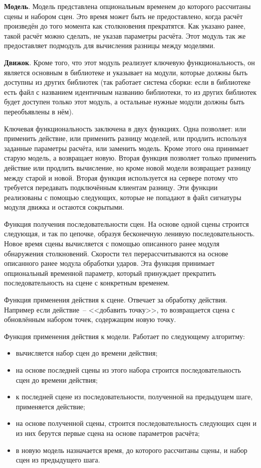 \textbf{Модель}.\label{modeldescr}
Модель представлена опциональным временем до которого рассчитаны сцены и набором сцен.
Это время может быть не предоставлено, когда расчёт произведён до того момента как столкновения прекратятся.
Как указано ранее, такой расчёт можно сделать, не указав параметры расчёта.
Этот модуль так же предоставляет подмодуль для вычисления разницы между моделями.

\textbf{Движок}.\label{enginedescr}
Кроме того, что этот модуль реализует ключевую функциональность, он является основным в библиотеке и указывает на модули, которые
должны быть доступны из других библиотек (так работает система сборки:
если в библиотеке есть файл с названием идентичным названию библиотеки, то из других библиотек будет доступен только этот модуль,
а остальные нужные модули должны быть переобъявлены в нём).

Ключевая функциональность заключена в двух функциях.
Одна позволяет: или применить действие, или применить разницу моделей,
или продлить используя заданные параметры расчёта, или заменить модель.
Кроме этого она принимает старую модель, а возвращает новую.
Вторая функция позволяет только применить действие или продлить вычисление, но кроме новой модели
возвращает разницу между старой и новой. Вторая функция используется на сервере потому
что требуется передавать подключённым клиентам разницу.
Эти функции реализованы с помощью следующих, которые не попадают в файл сигнатуры модуля движка и остаются сокрытыми.

Функция получения последовательности сцен. На основе одной сцены строится следующая,
и так по цепочке, образуя бесконечную ленивую последовательность.
Новое время сцены вычисляется с помощью описанного ранее модуля обнаружения столкновений.
Скорости тел перерассчитываются на основе описанного ранее модула обработки ударов.
Эта функция принимает опциональный временной параметр, который принуждает прекратить
последовательность на сцене с конкретным временем.

Функция применения действия к сцене. Отвечает за обработку действия.
Например если действие~-- <<добавить точку>>, то возвращается сцена с обновлённым набором точек, содержащим новую точку.

Функция применения действия к модели. Работает по следующему алгоритму:

\begin{itemize}
    \item вычисляется набор сцен до времени действия;
    \item на основе последней сцены из этого набора строится последовательность сцен до времени действия;
    \item к последней сцене из последовательности, полученной на предыдущем шаге, применяется действие;
    \item на основе полученной сцены, строится последовательность следующих сцен и из них берутся первые сцена на основе параметров расчёта;
    \item в новую модель назначается время, до которого рассчитаны сцены, и набор сцен из предыдущего шага.
\end{itemize}

